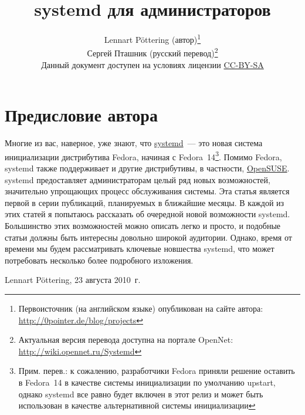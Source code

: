 \documentclass[10pt,oneside,a4paper]{article}
\newcommand{\sectiona}[1]{\section*{#1}\addcontentsline{toc}{section}{#1}}
\begin{document}
\sloppy
\title{systemd для администраторов}
\author{Lennart P\"{o}ttering (автор)\thanks{Первоисточник (на английском
языке) опубликован на сайте автора: \url{http://0pointer.de/blog/projects}}\\%
Сергей Пташник (русский перевод)\thanks{Актуальная версия перевода
доступна на портале OpenNet: \url{http://wiki.opennet.ru/Systemd}}\\%
\small Данный документ доступен на условиях лицензии
\href{http://creativecommons.org/licenses/by-sa/3.0/legalcode}{CC-BY-SA}}
\maketitle
\tableofcontents%
\sectiona{Предисловие автора}
Многие из вас, наверное, уже знают, что
\href{http://www.freedesktop.org/wiki/Software/systemd}{systemd}~--- это
новая система инициализации дистрибутива Fedora, начиная с
Fedora~14\footnote{Прим. перев.: к сожалению, разработчики Fedora приняли
решение оставить в Fedora~14 в качестве системы инициализации по умолчанию
upstart, однако systemd все равно будет включен в этот релиз и может быть
использован в качестве альтернативной системы инициализации}. Помимо Fedora,
systemd также поддерживает и другие дистрибутивы, в частности,
\href{http://en.opensuse.org/SDB:Systemd}{OpenSUSE}.
systemd предоставляет администраторам целый ряд новых возможностей,
значительно упрощающих процесс обслуживания системы. Эта статья является
первой в серии публикаций, планируемых в ближайшие месяцы. В каждой из этих
статей я попытаюсь рассказать об очередной новой возможности systemd.
Большинство этих возможностей можно описать легко и просто, и подобные статьи
должны быть интересны довольно широкой аудитории.  Однако, время от времени
мы будем рассматривать ключевые новшества systemd, что может потребовать
несколько более подробного изложения. 
\begin{flushright}
	Lennart P\"{o}ttering, 23 августа 2010~г.
\end{flushright}
\end{document}
